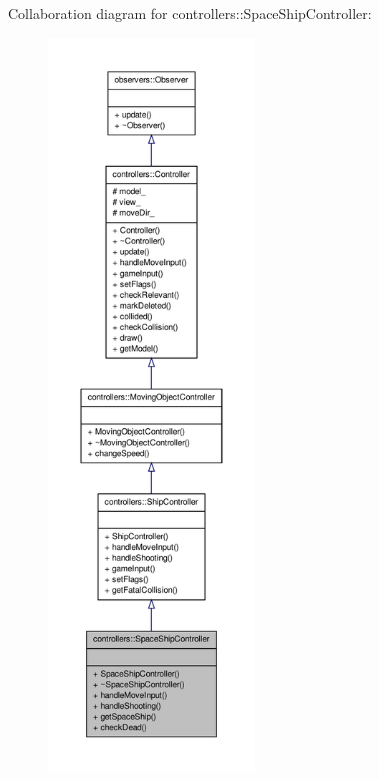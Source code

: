 \-Collaboration diagram for controllers\-:\-:\-Space\-Ship\-Controller\-:\nopagebreak
\begin{figure}[H]
\begin{center}
\leavevmode
\includegraphics[height=550pt]{dc/dd9/classcontrollers_1_1SpaceShipController__coll__graph}
\end{center}
\end{figure}

